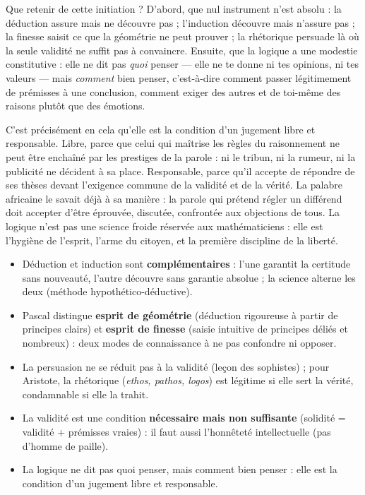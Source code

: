 \documentclass[11pt]{article}
\newcommand{\cle}[1]{{\popxbold\color{popdark}#1}}
\begin{document}
Que retenir de cette initiation ? D'abord, que nul instrument n'est absolu : la déduction assure mais ne découvre pas ; l'induction découvre mais n'assure pas ; la finesse saisit ce que la géométrie ne peut prouver ; la rhétorique persuade là où la seule validité ne suffit pas à convaincre. Ensuite, que la logique a une modestie constitutive : elle ne dit pas \emph{quoi} penser — elle ne te donne ni tes opinions, ni tes valeurs — mais \emph{comment} bien penser, c'est-à-dire comment passer légitimement de prémisses à une conclusion, comment exiger des autres et de toi-même des raisons plutôt que des émotions.

C'est précisément en cela qu'elle est la condition d'un jugement \cle{libre} et \cle{responsable}. Libre, parce que celui qui maîtrise les règles du raisonnement ne peut être enchaîné par les prestiges de la parole : ni le tribun, ni la rumeur, ni la publicité ne décident à sa place. Responsable, parce qu'il accepte de répondre de ses thèses devant l'exigence commune de la validité et de la vérité. La palabre africaine le savait déjà à sa manière : la parole qui prétend régler un différend doit accepter d'être éprouvée, discutée, confrontée aux objections de tous. La logique n'est pas une science froide réservée aux mathématiciens : elle est l'hygiène de l'esprit, l'arme du citoyen, et la première discipline de la liberté.

\begin{aretenir}
\begin{itemize}
\item Déduction et induction sont \textbf{complémentaires} : l'une garantit la certitude sans nouveauté, l'autre découvre sans garantie absolue ; la science alterne les deux (méthode hypothético-déductive).
\item Pascal distingue \textbf{esprit de géométrie} (déduction rigoureuse à partir de principes clairs) et \textbf{esprit de finesse} (saisie intuitive de principes déliés et nombreux) : deux modes de connaissance à ne pas confondre ni opposer.
\item La persuasion ne se réduit pas à la validité (leçon des sophistes) ; pour Aristote, la rhétorique (\emph{ethos, pathos, logos}) est légitime si elle sert la vérité, condamnable si elle la trahit.
\item La validité est une condition \textbf{nécessaire mais non suffisante} (solidité = validité + prémisses vraies) : il faut aussi l'honnêteté intellectuelle (pas d'homme de paille).
\item La logique ne dit pas quoi penser, mais comment bien penser : elle est la condition d'un jugement libre et responsable.
\end{itemize}
\end{aretenir}
\end{document}
